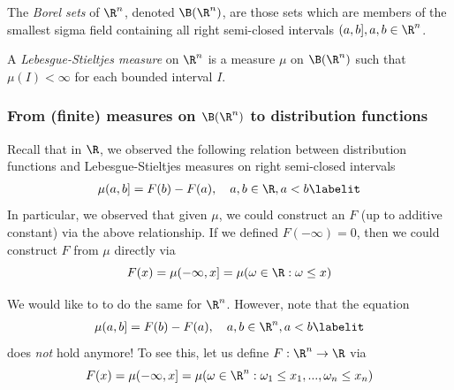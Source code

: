 \documentclass{article} %
\begin{document}
\begin{definition}
The \textit{Borel sets} of 	$\R^n$, denoted $\B(\R^n)$, are those sets which are members of the smallest sigma field containing all right semi-closed intervals $(a,b], a,b \in \R^n$. 
\end{definition}

\begin{definition}
A \textit{Lebesgue-Stieltjes measure} on $\R^n$ is a measure $\mu$ on $\B(\R^n)$ such that $\mu(I) < \infty$ for each bounded interval $I$. 	
\end{definition}


\subsubsection{From (finite) measures on $\B(\R^n)$ to distribution functions}
Recall that in $\R$, we observed the following relation between distribution functions  and Lebesgue-Stieltjes measures on right semi-closed intervals 
\begin{align*}
\mu(a,b] = F(b) - F(a), \quad a,b \in \R, a<b 
\labelit \label{eqn:measure_as_distribution_function_difference_for_motivating_LS_in_Rn}
\end{align*}
In particular, we observed that given $\mu$, we could construct an $F$ (up to additive constant) via the above relationship.   If we defined $F(-\infty) = 0$, then we could construct $F$ from $\mu$ directly via 
\[ F(x)=\mu(-\infty, x] = \mu(\omega \in \R : \omega \leq x) \]

We would like to to do the same for $\R^n$.  However, note that the equation 
\begin{align*}
\mu(a,b] = F(b) - F(a), \quad a,b \in \R^n, a<b 	
\labelit \label{eqn:measure_as_distribution_function_difference_for_motivating_LS_in_Rn}
\end{align*}
does \textit{not} hold anymore! To see this, let us define  $F : \R^n \to \R$ via 
\[  F(x) = \mu(-\infty, x] = \mu(\omega \in \R^n : \omega_1 \leq x_1, ..., \omega_n \leq x_n)\]

\end{document}
